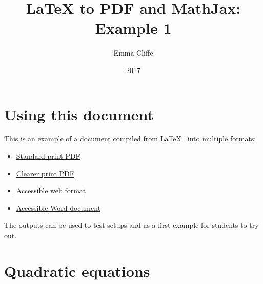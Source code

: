 \documentclass[12pt,a4paper]{article}
\title{LaTeX to PDF and MathJax: Example 1}
\author{Emma Cliffe}
\date{2017}
\theoremstyle{clearprint}
\begin{document}
\maketitle

\tableofcontents
\listoffigures
\listoftables
\newpage

\setcounter{page}{1}

\section*{Using this document}

This is an example of a document compiled from \LaTeX~ into multiple formats:
\begin{itemize} 
\item \href{https://stem-enable.github.io/LaTeXtoPDFandMathJax-Example1/LaTeXtoPDFandMathJax-1-standard.pdf}{Standard print PDF}
\item \href{https://stem-enable.github.io/LaTeXtoPDFandMathJax-Example1/LaTeXtoPDFandMathJax-1-clear.pdf}{Clearer print PDF}
\item \href{https://stem-enable.github.io/LaTeXtoPDFandMathJax-Example1/}{Accessible web format}
\item \href{https://stem-enable.github.io/LaTeXtoPDFandMathJax-Example1/LaTeXtoPDFandMathJax-1.docx}{Accessible Word document}
\end{itemize}

The outputs can be used to test setups and as a first example for students to try out. 



\newpage
\section{Quadratic equations}
\end{document}
